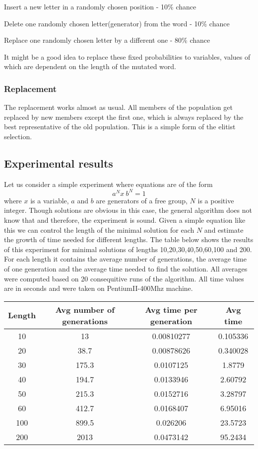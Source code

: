 \documentclass{article}
\begin{document}
Insert a new letter in a randomly chosen position - 10\% chance
 
Delete one randomly chosen letter(generator) from the word -  10\% chance

Replace one randomly chosen letter by a different one -  80\% chance

\noindent
It might be a good idea to replace these fixed probabilities to
variables, values of which are dependent on the length of the mutated
word.

    \subsubsection{Replacement}

The replacement works almost as usual. All members of the population
get replaced by new members except the first one, which is always
replaced by the best representative of the old population. This is a
simple form of the elitist selection.

  \subsection{Experimental results}

Let us consider a simple experiment where equations are of the form
\[
a^N x \: b^N = 1
\]
where $x$ is a variable, $a$ and $b$ are generators of a free group,
$N$ is a positive integer. Though solutions are obvious in this case,
the general algorithm does not know that and therefore, the experiment
is sound. Given a simple equation like this we can control the length
of the minimal solution for each $N$ and estimate the growth of time
needed for different lengths. The table below shows the results of
this experiment for minimal solutions of lengths 10,20,30,40,50,60,100
and 200. For each length it contains the average number of
generations, the average time of one generation and the average time
needed to find the solution. All averages were computed based on 20
consequitive runs of the algorithm. All time values are in seconds and
were taken on PentiumII-400Mhz machine. 

\vspace{3mm}
\begin{tabular}{|c|c|c|c|} \hline
Length & Avg number of generations & Avg time per generation & Avg time \\ 
\hline
10 & 13 & 0.00810277 & 0.105336 \\ \hline
20 & 38.7 & 0.00878626 & 0.340028 \\ \hline
30 & 175.3 & 0.0107125 & 1.8779 \\ \hline
40 & 194.7 & 0.0133946 & 2.60792 \\ \hline
50 & 215.3 & 0.0152716 & 3.28797 \\ \hline
60 & 412.7 & 0.0168407 & 6.95016 \\ \hline
100 & 899.5 & 0.026206 & 23.5723 \\ \hline
200 & 2013 & 0.0473142 & 95.2434 \\ \hline
\end{tabular}
\vspace{3mm}
\end{document}
